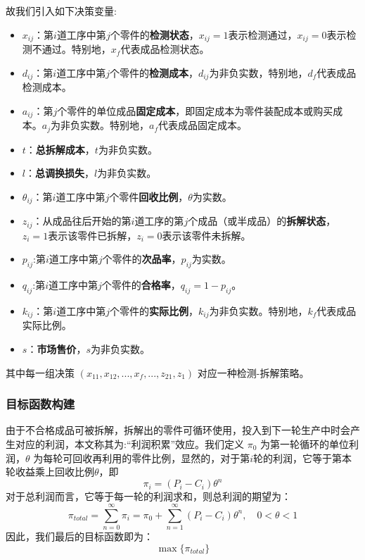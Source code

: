 \documentclass[withoutpreface,bwprint]{cumcmthesis}
\begin{document}
故我们引入如下决策变量:
\begin{itemize}
   \item $x_{ij}$：第$i$道工序中第$j$个零件的\textbf{检测状态}，$x_{ij}=1$表示检测通过，$x_{ij}=0$表示检测不通过。特别地，$x_f$代表成品检测状态。
   \item $d_{ij}$：第$i$道工序中第$j$个零件的\textbf{检测成本}，$d_{ij}$为非负实数，特别地，$d_f$代表成品检测成本。
   \item $a_{ij}$：第$j$个零件的单位成品\textbf{固定成本}，即固定成本为零件装配成本或购买成本。$a_{j}$为非负实数。特别地，$a_f$代表成品固定成本。
   \item $t$：\textbf{总拆解成本}，$t$为非负实数。
   \item $l$：\textbf{总调换损失}，$l$为非负实数。
   \item $\theta_{ij}$：第$i$道工序中第$j$个零件\textbf{回收比例}，$\theta$为实数。
   \item $z_{ij}$：从成品往后开始的第$i$道工序的第$j$个成品（或半成品）的\textbf{拆解状态}，$z_{i}=1$表示该零件已拆解，$z_{i}=0$表示该零件未拆解。
   \item $p_{ij}$:第$i$道工序中第$j$个零件的\textbf{次品率}，$p_{ij}$为实数。
   \item $q_{ij}$:第$i$道工序中第$j$个零件的\textbf{合格率}，$q_{ij}=1-p_{ij}$。
   \item $k_{ij}$：第$i$道工序中第$j$个零件的\textbf{实际比例}，$k_{ij}$为非负实数。特别地，$k_f$代表成品实际比例。
   \item $s$：\textbf{市场售价}，$s$为非负实数。
\end{itemize}

其中每一组决策 $(x_{11}, x_{12}, ..., x_f,... ,z_{21}, z_1)$ 对应一种检测-拆解策略。
\subsubsection{目标函数构建}
由于不合格成品可被拆解，拆解出的零件可循环使用，投入到下一轮生产中时会产生对应的利润，本文称其为:“利润积累”效应。我们定义 $\pi_0$ 为第一轮循环的单位利润，$\theta$ 为每轮可回收再利用的零件比例，显然的，对于第$i$轮的利润，它等于第本轮收益乘上回收比例$\theta$，即
\begin{equation}
\pi_i=(P_i-C_i)\theta^n
\end{equation}
对于总利润而言，它等于每一轮的利润求和，则总利润的期望为：
\begin{equation}
\pi_{total}=\sum_{n=0}^{\infty}\pi_i=\pi_0+\sum_{n=1}^{\infty}(P_i-C_i)\theta^n,\quad 0<\theta<1
\end{equation}
因此，我们最后的目标函数即为：
\begin{equation}
\max\{\pi_{total}\}
\end{equation}
\end{document}
